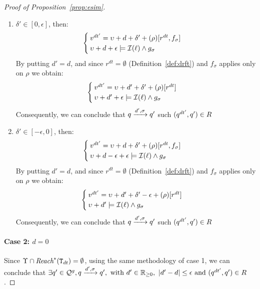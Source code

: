 \begin{proof}[Proof of Proposition~\ref{prop:esim}]
  \begin{enumerate}
    \item $\delta'\in[0,\epsilon]$, then:\\
      \[\begin{cases}{}
        v^{dt'}=\upsilon+d+\delta'+(\rho)[r^{dt},f_{\sigma}]\\ 
      \upsilon+d+\epsilon\models\mathcal{I}(\ell)\wedge g_{\sigma} \label{1} 
    \end{cases}\]
    By putting $d'=d$, and  since $r^{dt}=\emptyset$ (Definition~\ref{def:drft}) and 
      $f_{\sigma}$ applies only on $\rho$ we obtain: 
      \[\begin{cases}
        v^{dt'}=\upsilon+d'+\delta'+(\rho)[r^{dt}] \\ 
      \upsilon+d'+\epsilon\models\mathcal{I}(\ell)\wedge g_{\sigma} \label{1} 
      \end{cases}\]%
      Consequently, we can conclude that $q\xrightarrow{d',\sigma}q'$ such $(q^{dt'},q')\in R$
    \item $\delta'\in[-\epsilon,0]$, then:\\
      \[\begin{cases}{}
        v^{dt'}=\upsilon+d+\delta'+(\rho)[r^{dt},f_{\sigma}]\\ 
      \upsilon+d-\epsilon+\epsilon\models\mathcal{I}(\ell)\wedge g_{\sigma} \label{1} 
    \end{cases}\]
    By putting $d'=d$, and  since $r^{dt}=\emptyset$ (Definition~\ref{def:drft}) and 
      $f_{\sigma}$ applies only on $\rho$ we obtain: 
      \[\begin{cases}
        v^{dt'}=\upsilon+d'+\delta'-\epsilon+(\rho)[r^{dt}] \\ 
      \upsilon+d'\models\mathcal{I}(\ell)\wedge g_{\sigma} \label{1} 
      \end{cases}\]%
      Consequently, we can conclude that $q\xrightarrow{d',\sigma}q'$ such $(q^{dt'},q')\in R$
  \end{enumerate}
  
  \paragraph{\textbf{Case 2: $d = 0$}\\}
   Since $\Upsilon\cap\textit{Reach}^*(\texttt{T}_{dt})=\emptyset$, using the same methodology of case 1, 
   we can conclude that $\exists q'\in\mathcal{Q}^g, q\xrightarrow{d',\sigma}q',\text{ with } 
        d'\in\mathbb{R}_{\ge 0}, \ |d'-d|\le\epsilon \text{ and } (q^{dt'},q')\in R$.
\end{proof}

